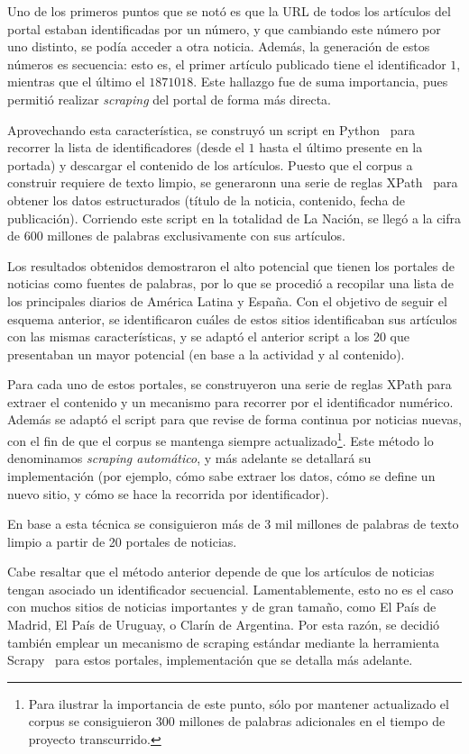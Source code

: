 Uno de los primeros puntos que se notó es que la URL de todos los artículos del portal estaban
identificadas por un número, y que cambiando este número por uno distinto, se podía acceder a otra
noticia. Además, la generación de estos números es secuencia: esto es, el primer artículo publicado
tiene el identificador $1$, mientras que el último el $1871018$. Este hallazgo fue de suma
importancia, pues permitió realizar \textit{scraping} del portal de forma más directa.

Aprovechando esta característica, se construyó un script en Python~\cite{Python} para recorrer la
lista de identificadores (desde el $1$ hasta el último presente en la portada) y descargar el
contenido de los artículos. Puesto que el corpus a construir requiere de texto limpio, se generaronn
una serie de reglas XPath~\cite{XPath} para obtener los datos estructurados (título de la noticia,
contenido, fecha de publicación). Corriendo este script en la totalidad de La Nación, se llegó a la
cifra de 600 millones de palabras exclusivamente con sus artículos.

Los resultados obtenidos demostraron el alto potencial que tienen los portales de noticias como
fuentes de palabras, por lo que se procedió a recopilar una lista de los principales diarios de
América Latina y España. Con el objetivo de seguir el esquema anterior, se identificaron cuáles de
estos sitios identificaban sus artículos con las mismas características, y se adaptó el anterior
script a los 20 que presentaban un mayor potencial (en base a la actividad y al contenido).

Para cada uno de estos portales, se construyeron una serie de reglas XPath para extraer el contenido
y un mecanismo para recorrer por el identificador numérico. Además se adaptó el script para que
revise de forma continua por noticias nuevas, con el fin de que el corpus se mantenga siempre
actualizado\footnote{Para ilustrar la importancia de este punto, sólo por mantener actualizado el
corpus se consiguieron 300 millones de palabras adicionales en el tiempo de proyecto
transcurrido.}. Este método lo denominamos \textit{scraping automático}, y más adelante se detallará
su implementación (por ejemplo, cómo sabe extraer los datos, cómo se define un nuevo sitio, y cómo se
hace la recorrida por identificador).

En base a esta técnica se consiguieron más de 3 mil millones de palabras de texto limpio a partir de
20 portales de noticias.


Cabe resaltar que el método anterior depende de que los artículos de noticias tengan asociado un
identificador secuencial. Lamentablemente, esto no es el caso con muchos sitios de noticias
importantes y de gran tamaño, como El País de Madrid, El País de Uruguay, o Clarín de Argentina. Por
esta razón, se decidió también emplear un mecanismo de scraping estándar mediante la herramienta
Scrapy~\cite{Scrapy} para estos portales, implementación que se detalla más adelante.


